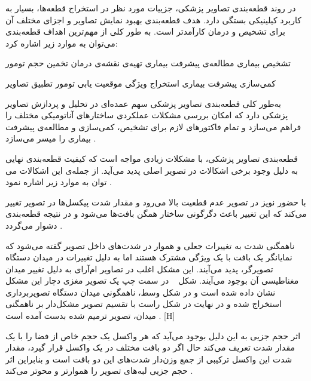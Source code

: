 در روند قطعه‌بندی تصاویر پزشکی، جزییات مورد نظر در استخراج قطعه‌ها، بسیار به کاربرد کیلینیکی بستگی دارد. هدف قطعه‌بندی بهبود نمایش تصاویر و اجزای مختلف آن برای تشخیص و درمان کارآمدتر است. به طور کلی از مهم‌ترین اهداف قطعه‌بندی می‌توان به موارد زیر اشاره کرد:
\begin{multicols}{2}
	 تشخیص بیماری
	 مطالعه‌ی پیشرفت بیماری
     تهیه‌ی نقشه‌ی درمان
     تخمین حجم تومور
	
	 کمی‌سازی پیشرفت بیماری
	 استخراج ویژگی
	 موقعیت یابی تومور
	 تطبیق تصاویر
	
\end{multicols}

به‌طور کلی قطعه‌بندی تصاویر پزشکی سهم عمده‌ای در تحلیل و پردازش تصاویر پزشکی دارد که امکان بررسی مشکلات عملکردی ساختارهای آناتومیکی مختلف را فراهم می‌سازد و تمام فاکتورهای لازم برای تشخیص، کمی‌سازی و مطالعه‌ی پیشرفت بیماری را میسر می‌سازد .

قطعه‌بندی تصاویر پزشکی، با مشکلات زیادی مواجه است که کیفیت قطعه‌بندی نهایی به دلیل وجود برخی اشکالات در تصویر اصلی پدید می‌آید. از جمله‌ی این اشکالات می توان به موارد زیر اشاره نمود .

با حضور نویز در تصویر عدم قطعیت بالا می‌رود و مقدار شدت پیکسل‌ها در تصویر تغییر می‌کند که این تغییر باعث دگرگونی ساختار همگن بافت‌ها می‌شود و در نتیجه قطعه‌بندی دشوار می‌گردد  
.

ناهمگنی شدت به تغییرات جعلی و هموار در شدت‌های داخل تصویر گفته می‌شود که نمایانگر یک بافت با یک ویژگی مشترک هستند اما به دلیل تغییرات در میدان دستگاه تصویرگر، پدید می‌آیند. این مشکل اغلب در تصاویر ام‌آرای به دلیل تغییر میدان مغناطیسی آن بوجود می‌آیند. شکل ~ در سمت چپ یک تصویر مغزی دچار این مشکل نشان داده شده است و در شکل وسط، ناهمگونی میدان دستگاه تصویربرداری استخراج شده و در نهایت در شکل راست با تقسیم تصویر مشکل‌دار بر ناهمگنی میدان، تصویر ترمیم شده بدست آمده است .
[H]

اثر حجم جزیی به این دلیل بوجود می‌آید که هر واکسل یک حجم خاص از فضا را با یک مقدار شدت تعریف می‌کند حال اگر دو بافت مختلف در یک واکسل قرار گیرد، مقدار شدت این واکسل ترکیبی از جمع وزن‌دار شدت‌های این دو بافت است و بنابراین اثر حجم جزیی لبه‌های تصویر را هموارتر و محوتر می‌کند .

